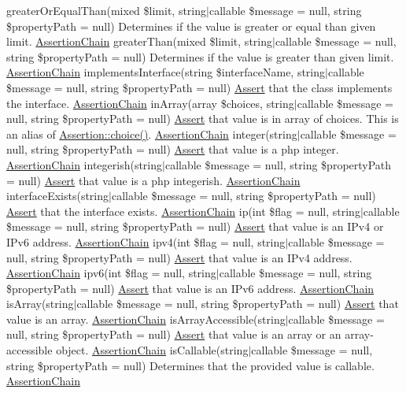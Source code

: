 greater\+Or\+Equal\+Than(mixed \$limit, string$\vert$callable \$message = null, string \$property\+Path = null) Determines if the value is greater or equal than given limit.  \mbox{\hyperlink{class_assert_1_1_assertion_chain}{Assertion\+Chain}} greater\+Than(mixed \$limit, string$\vert$callable \$message = null, string \$property\+Path = null) Determines if the value is greater than given limit.  \mbox{\hyperlink{class_assert_1_1_assertion_chain}{Assertion\+Chain}} implements\+Interface(string \$interface\+Name, string$\vert$callable \$message = null, string \$property\+Path = null) \mbox{\hyperlink{class_assert_1_1_assert}{Assert}} that the class implements the interface.  \mbox{\hyperlink{class_assert_1_1_assertion_chain}{Assertion\+Chain}} in\+Array(array \$choices, string$\vert$callable \$message = null, string \$property\+Path = null) \mbox{\hyperlink{class_assert_1_1_assert}{Assert}} that value is in array of choices. This is an alias of \mbox{\hyperlink{class_assert_1_1_assertion_a3775923caa193a78aa0bb48a66ee61d0}{Assertion\+::choice()}}.  \mbox{\hyperlink{class_assert_1_1_assertion_chain}{Assertion\+Chain}} integer(string$\vert$callable \$message = null, string \$property\+Path = null) \mbox{\hyperlink{class_assert_1_1_assert}{Assert}} that value is a php integer.  \mbox{\hyperlink{class_assert_1_1_assertion_chain}{Assertion\+Chain}} integerish(string$\vert$callable \$message = null, string \$property\+Path = null) \mbox{\hyperlink{class_assert_1_1_assert}{Assert}} that value is a php integer\textquotesingle{}ish.  \mbox{\hyperlink{class_assert_1_1_assertion_chain}{Assertion\+Chain}} interface\+Exists(string$\vert$callable \$message = null, string \$property\+Path = null) \mbox{\hyperlink{class_assert_1_1_assert}{Assert}} that the interface exists.  \mbox{\hyperlink{class_assert_1_1_assertion_chain}{Assertion\+Chain}} ip(int \$flag = null, string$\vert$callable \$message = null, string \$property\+Path = null) \mbox{\hyperlink{class_assert_1_1_assert}{Assert}} that value is an I\+Pv4 or I\+Pv6 address.  \mbox{\hyperlink{class_assert_1_1_assertion_chain}{Assertion\+Chain}} ipv4(int \$flag = null, string$\vert$callable \$message = null, string \$property\+Path = null) \mbox{\hyperlink{class_assert_1_1_assert}{Assert}} that value is an I\+Pv4 address.  \mbox{\hyperlink{class_assert_1_1_assertion_chain}{Assertion\+Chain}} ipv6(int \$flag = null, string$\vert$callable \$message = null, string \$property\+Path = null) \mbox{\hyperlink{class_assert_1_1_assert}{Assert}} that value is an I\+Pv6 address.  \mbox{\hyperlink{class_assert_1_1_assertion_chain}{Assertion\+Chain}} is\+Array(string$\vert$callable \$message = null, string \$property\+Path = null) \mbox{\hyperlink{class_assert_1_1_assert}{Assert}} that value is an array.  \mbox{\hyperlink{class_assert_1_1_assertion_chain}{Assertion\+Chain}} is\+Array\+Accessible(string$\vert$callable \$message = null, string \$property\+Path = null) \mbox{\hyperlink{class_assert_1_1_assert}{Assert}} that value is an array or an array-\/accessible object.  \mbox{\hyperlink{class_assert_1_1_assertion_chain}{Assertion\+Chain}} is\+Callable(string$\vert$callable \$message = null, string \$property\+Path = null) Determines that the provided value is callable.  \mbox{\hyperlink{class_assert_1_1_assertion_chain}{Assertion\+Chain}} 